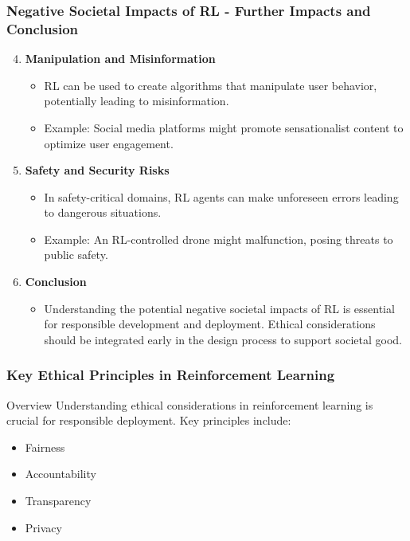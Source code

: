 \documentclass[aspectratio=169]{beamer}
\begin{document}
\begin{frame}[fragile]
    \frametitle{Negative Societal Impacts of RL - Further Impacts and Conclusion}
    \begin{enumerate}
        \setcounter{enumi}{3} %
        \item \textbf{Manipulation and Misinformation}
        \begin{itemize}
            \item RL can be used to create algorithms that manipulate user behavior, potentially leading to misinformation.
            \item Example: Social media platforms might promote sensationalist content to optimize user engagement.
        \end{itemize}
        
        \item \textbf{Safety and Security Risks}
        \begin{itemize}
            \item In safety-critical domains, RL agents can make unforeseen errors leading to dangerous situations.
            \item Example: An RL-controlled drone might malfunction, posing threats to public safety.
        \end{itemize}
        
        \item \textbf{Conclusion}
        \begin{itemize}
            \item Understanding the potential negative societal impacts of RL is essential for responsible development and deployment. Ethical considerations should be integrated early in the design process to support societal good.
        \end{itemize}
    \end{enumerate}
\end{frame}

\begin{frame}[fragile]
  \frametitle{Key Ethical Principles in Reinforcement Learning}
  \begin{block}{Overview}
    Understanding ethical considerations in reinforcement learning is crucial for responsible deployment. Key principles include:
    \begin{itemize}
      \item Fairness
      \item Accountability
      \item Transparency
      \item Privacy
    \end{itemize}
  \end{block}
\end{frame}
\end{document}
